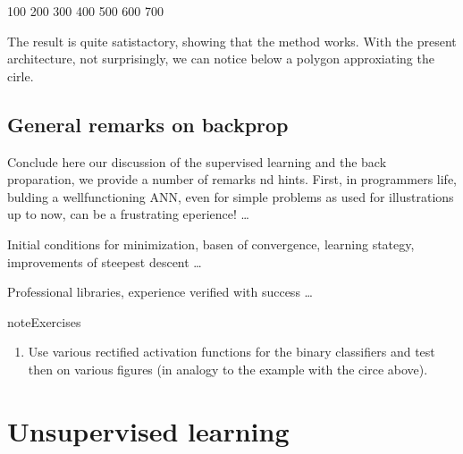 \documentclass[letterpaper,10pt,english]{jupyterBook}
\begin{document}
\begin{sphinxVerbatim}[commandchars=\\\{\}]
100  200  300  400  500  600  700  
\end{sphinxVerbatim}

\sphinxAtStartPar
The result is quite satistactory, showing that the method works. With the present architecture, not surprisingly, we can notice below a polygon approxiating the cirle.

\noindent{}


\section{General remarks on backprop}
\label{\detokenize{docs/rectification:general-remarks-on-backprop}}
\sphinxAtStartPar
Conclude here our discussion of the supervised learning and the back proparation, we provide a number of remarks nd hints. First, in programmers life, bulding a well\sphinxhyphen{}functioning ANN, even for simple problems as used for illustrations up to now, can be a frustrating eperience! …

\sphinxAtStartPar
Initial conditions for minimization, basen of convergence, learning stategy, improvements of steepest descent …

\sphinxAtStartPar
Professional libraries, experience verified with success …

\begin{sphinxadmonition}{note}{Exercises}
\begin{enumerate}
%
\item {} 
\sphinxAtStartPar
Use various rectified activation functions for the binary classifiers and test then on various figures (in analogy to the example with the circe above).

\end{enumerate}
\end{sphinxadmonition}


\chapter{Unsupervised learning}
\label{\detokenize{docs/unsupervised:unsupervised-learning}}\label{\detokenize{docs/unsupervised:un-lab}}\label{\detokenize{docs/unsupervised::doc}}
\begin{sphinxVerbatim}[commandchars=\\\{\}]
    
\end{sphinxVerbatim}
\end{document}
